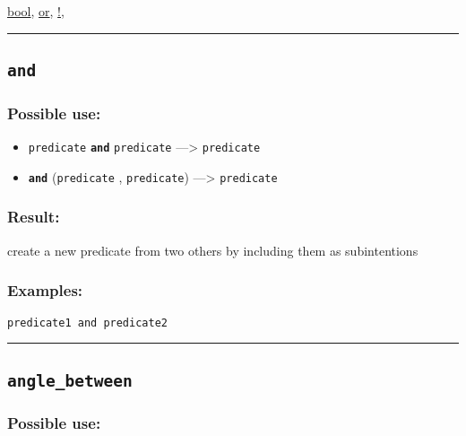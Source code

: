 \documentclass[]{book}
\providecommand{\tightlist}{%
  \setlength{\itemsep}{0pt}\setlength{\parskip}{0pt}}
\theoremstyle{definition}
\theoremstyle{definition}
\theoremstyle{definition}
\theoremstyle{remark}
\begin{document}
\href{OperatorsBC\#bool}{bool}, \href{OperatorsNR\#or}{or},
\href{OperatorsAA\#!}{!},

\begin{center}\rule{0.5\linewidth}{\linethickness}\end{center}

\subsection{\texorpdfstring{\texttt{and}}{and}}\label{and-1}

\subsubsection{Possible use:}\label{possible-use-36}

\begin{itemize}
\tightlist
\item
  \texttt{predicate} \textbf{\texttt{and}} \texttt{predicate}
  ---\textgreater{} \texttt{predicate}
\item
  \textbf{\texttt{and}} (\texttt{predicate} , \texttt{predicate})
  ---\textgreater{} \texttt{predicate}
\end{itemize}

\subsubsection{Result:}\label{result-35}

create a new predicate from two others by including them as
subintentions

\subsubsection{Examples:}\label{examples-28}

\begin{verbatim}
predicate1 and predicate2 
\end{verbatim}

\begin{center}\rule{0.5\linewidth}{\linethickness}\end{center}

\subsection{\texorpdfstring{\texttt{angle\_between}}{angle\_between}}\label{angle_between}

\subsubsection{Possible use:}\label{possible-use-37}
\end{document}
